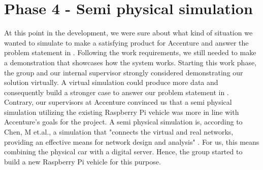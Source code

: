 \section{Phase 4 - Semi physical simulation}
At this point in the development, we were sure about what kind of situation we wanted to simulate to make a satisfying product for Accenture and answer the problem statement in . Following the work requirements, we still needed to make a demonstration that showcases how the system works. Starting this work phase, the group and our internal supervisor strongly considered demonstrating our solution virtually. A virtual simulation could produce more data and consequently build a stronger case to answer our problem statement in . Contrary, our supervisors at Accenture convinced us that a semi physical simulation utilizing the existing Raspberry Pi vehicle was more in line with Accenture's goals for the project. A semi physical simulation is, according to Chen, M et.al., a simulation that "connects the virtual and real networks, providing an effective means for network design and analysis" \parencite{Chen2019}. For us, this means combining the physical car with a digital server. Hence, the group started to build a new Raspberry Pi vehicle for this purpose.




\clearpage
%
%

